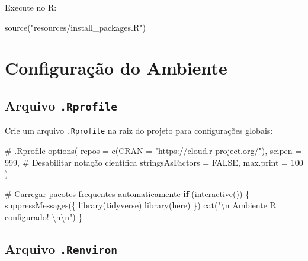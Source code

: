 \documentclass[
  letterpaper,
]{book}
\newenvironment{Shaded}{\begin{snugshade}}{\end{snugshade}}
\newcommand{\AttributeTok}[1]{\textcolor[rgb]{0.40,0.45,0.13}{#1}}
\newcommand{\CommentTok}[1]{\textcolor[rgb]{0.37,0.37,0.37}{#1}}
\newcommand{\ConstantTok}[1]{\textcolor[rgb]{0.56,0.35,0.01}{#1}}
\newcommand{\ControlFlowTok}[1]{\textcolor[rgb]{0.00,0.23,0.31}{\textbf{#1}}}
\newcommand{\DecValTok}[1]{\textcolor[rgb]{0.68,0.00,0.00}{#1}}
\newcommand{\FunctionTok}[1]{\textcolor[rgb]{0.28,0.35,0.67}{#1}}
\newcommand{\NormalTok}[1]{\textcolor[rgb]{0.00,0.23,0.31}{#1}}
\newcommand{\SpecialCharTok}[1]{\textcolor[rgb]{0.37,0.37,0.37}{#1}}
\newcommand{\StringTok}[1]{\textcolor[rgb]{0.13,0.47,0.30}{#1}}
\begin{document}
Execute no R:

\begin{Shaded}
\begin{Highlighting}[]
\FunctionTok{source}\NormalTok{(}\StringTok{"resources/install\_packages.R"}\NormalTok{)}
\end{Highlighting}
\end{Shaded}

\section*{Configuração do
Ambiente}\label{configurauxe7uxe3o-do-ambiente}


\subsection*{\texorpdfstring{Arquivo
\texttt{.Rprofile}}{Arquivo .Rprofile}}\label{arquivo-.rprofile}

Crie um arquivo \texttt{.Rprofile} na raiz do projeto para configurações
globais:

\begin{Shaded}
\begin{Highlighting}[]
\CommentTok{\# .Rprofile}
\FunctionTok{options}\NormalTok{(}
  \AttributeTok{repos =} \FunctionTok{c}\NormalTok{(}\AttributeTok{CRAN =} \StringTok{"https://cloud.r{-}project.org/"}\NormalTok{),}
  \AttributeTok{scipen =} \DecValTok{999}\NormalTok{,           }\CommentTok{\# Desabilitar notação científica}
  \AttributeTok{stringsAsFactors =} \ConstantTok{FALSE}\NormalTok{,}
  \AttributeTok{max.print =} \DecValTok{100}
\NormalTok{)}

\CommentTok{\# Carregar pacotes frequentes automaticamente}
\ControlFlowTok{if}\NormalTok{ (}\FunctionTok{interactive}\NormalTok{()) \{}
  \FunctionTok{suppressMessages}\NormalTok{(\{}
    \FunctionTok{library}\NormalTok{(tidyverse)}
    \FunctionTok{library}\NormalTok{(here)}
\NormalTok{  \})}
  \FunctionTok{cat}\NormalTok{(}\StringTok{"}\SpecialCharTok{\textbackslash{}n}\StringTok{ Ambiente R configurado! }\SpecialCharTok{\textbackslash{}n\textbackslash{}n}\StringTok{"}\NormalTok{)}
\NormalTok{\}}
\end{Highlighting}
\end{Shaded}

\subsection*{\texorpdfstring{Arquivo
\texttt{.Renviron}}{Arquivo .Renviron}}\label{arquivo-.renviron}
\end{document}
